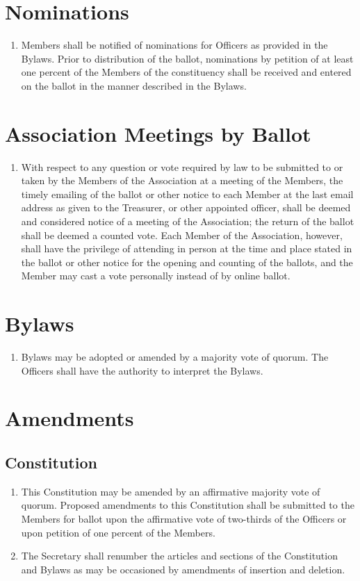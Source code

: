 \section{Nominations}
\begin{enumerate}
	\item Members shall be notified of nominations for Officers as provided in the Bylaws. Prior to distribution of the ballot, nominations by petition of at least one percent of the Members of the constituency shall be received and entered on the ballot in the manner described in the Bylaws.
\end{enumerate}

\section{Association Meetings by Ballot}
\begin{enumerate}
	\item With respect to any question or vote required by law to be submitted to or taken by the Members of the Association at a meeting of the Members, the timely emailing of the ballot or other notice to each Member at the last email address as given to the Treasurer, or other appointed officer, shall be deemed and considered notice of a meeting of the Association; the return of the ballot shall be deemed a counted vote. Each Member of the Association, however, shall have the privilege of attending in person at the time and place stated in the ballot or other notice for the opening and counting of the ballots, and the Member may cast a vote personally instead of by online ballot.
\end{enumerate}

\section{Bylaws}
\begin{enumerate}
	\item Bylaws may be adopted or amended by a majority vote of quorum. The Officers shall have the authority to interpret the Bylaws.
\end{enumerate}

\section{Amendments}

\subsection{Constitution}
\begin{enumerate}
	\item This Constitution may be amended by an affirmative majority vote of quorum. Proposed amendments to this Constitution shall be submitted to the Members for ballot upon the affirmative vote of two-thirds of the Officers or upon petition of one percent of the Members.
	\item The Secretary shall renumber the articles and sections of the Constitution and Bylaws as may be occasioned by amendments of insertion and deletion.
\end{enumerate}

